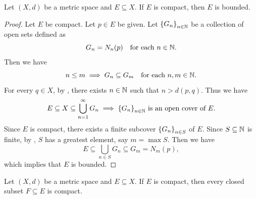 \bigskip

\begin{theorem} \label{an:thm:compact-set-is-bounded}
    Let $(X, d)$ be a metric space and $E \subseteq X$. If $E$ is compact, then $E$ is bounded.
\end{theorem}

\begin{proof}
    Let $E$ be compact. Let $p \in E$ be given. Let $\set*{G_{n}}_{n \in \N}$ be a collection of open sets defined as
    \[
    G_{n} = N_{n}(p) \quad \text{for each } n \in \N.
    \]
    Then we have
    \[
    n \leq m \implies G_{n} \subseteq G_{m} \quad \text{for each } n, m \in \N.
    \]
    For every $q \in X$, by , there exists $n \in \N$ such that $n > d(p, q)$. Thus we have
    \[
    E \subseteq X \subseteq \bigcup_{n = 1}^{\infty} G_{n} \implies \set*{G_{n}}_{n \in \N} \text{ is an open cover of } E.
    \]
    Since $E$ is compact, there exists a finite subcover $\set*{G_{n}}_{n \in S}$ of $E$. Since $S \subseteq \N$ is finite,
    by , $S$ has a greatest element, say $m = \max S$. Then we have
    \[
    E \subseteq \bigcup_{n \in S} G_{n} \subseteq G_{m} = N_{m}(p),
    \]
    which implies that $E$ is bounded.
\end{proof}

\bigskip

\begin{theorem} \label{an:thm:closed-subset-of-compact-set-is-compact}
    Let $(X, d)$ be a metric space and $E \subseteq X$. If $E$ is compact, then every closed subset $F \subseteq E$ is compact.
\end{theorem}

